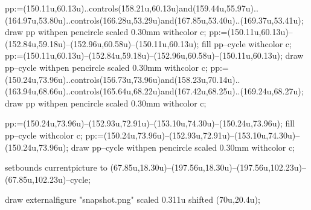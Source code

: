 pp:=(150.11u,60.13u)..controls(158.21u,60.13u)and(159.44u,55.97u)..(164.97u,53.80u)..controls(166.28u,53.29u)and(167.85u,53.40u)..(169.37u,53.41u);
draw pp withpen pencircle scaled 0.30mm withcolor c;
pp:=(150.11u,60.13u)--(152.84u,59.18u)--(152.96u,60.58u)--(150.11u,60.13u);
fill pp--cycle withcolor c;
pp:=(150.11u,60.13u)--(152.84u,59.18u)--(152.96u,60.58u)--(150.11u,60.13u);
draw pp--cycle withpen pencircle scaled 0.30mm withcolor c;
pp:=(150.24u,73.96u)..controls(156.73u,73.96u)and(158.23u,70.14u)..(163.94u,68.66u)..controls(165.64u,68.22u)and(167.42u,68.25u)..(169.24u,68.27u);
draw pp withpen pencircle scaled 0.30mm withcolor c;

pp:=(150.24u,73.96u)--(152.93u,72.91u)--(153.10u,74.30u)--(150.24u,73.96u);
fill pp--cycle withcolor c;
pp:=(150.24u,73.96u)--(152.93u,72.91u)--(153.10u,74.30u)--(150.24u,73.96u);
draw pp--cycle withpen pencircle scaled 0.30mm withcolor c;

setbounds currentpicture to (67.85u,18.30u)--(197.56u,18.30u)--(197.56u,102.23u)--(67.85u,102.23u)--cycle;


draw externalfigure "snapshot.png" scaled 0.311u shifted (70u,20.4u);

\stopuseMPgraphic
{}
\stopTEXpage